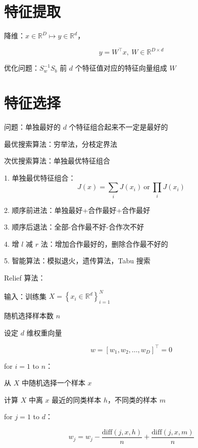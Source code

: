 \documentclass[openany,a4paper,12pt]{ctexbook}
\theoremstyle{kaiti}
\theoremstyle{normal}
\begin{document}
\section{特征提取}

降维：$x\in \mathbb{R} ^D\mapsto y\in \mathbb{R} ^d$，

\begin{equation}
y=W^{\top}x,~W\in \mathbb{R} ^{D\times d}
\end{equation}

优化问题：$S_{w}^{-1}S_b$ 前 $d$ 个特征值对应的特征向量组成 $W$

\section{特征选择}

问题：单独最好的 $d$ 个特征组合起来不一定是最好的

最优搜索算法：穷举法，分枝定界法

次优搜索算法：单独最优特征组合

1. 单独最优特征组合：
\begin{equation}
  J(x)=\sum_iJ\left(x_i \right)~\mathrm{or}~ \prod_iJ\left(x_i \right)
\end{equation}

2. 顺序前进法：单独最好+合作最好+合作最好

3. 顺序后退法：全部-合作最不好-合作次不好

4. 增 $l$ 减 $r$ 法：增加合作最好的，删除合作最不好的

5. 智能算法：模拟退火，遗传算法，Tabu 搜索

Relief 算法：

输入：训练集 $X=\left\{ x_i\in \mathbb{R} ^d \right\}_{i=1}^{N}$ 

随机选择样本数 $n$

设定 $d$ 维权重向量 

\begin{equation}
w=[w_1,w_2,…,w_D]^{\top}=0
\end{equation}

for $i=1$ to $n$：

从 $X$ 中随机选择一个样本 $x$

计算 $X$ 中离 $x$ 最近的同类样本 $h$，不同类的样本 $m$

for $j=1$ to $d$：

\begin{equation}
w_j=w_j-\frac{\mathrm{diff}(j,x,h)}{n}+\frac{\mathrm{diff}(j,x,m)}{n}
\end{equation}
\end{document}
